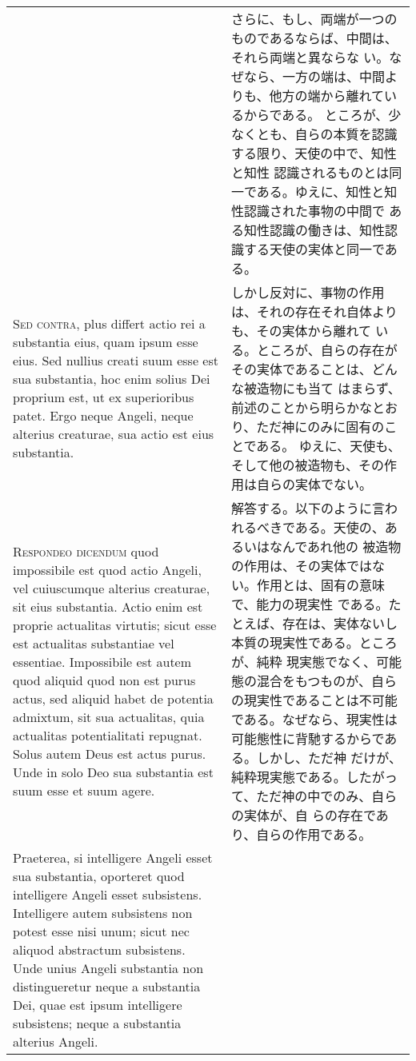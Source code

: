 \documentclass[10pt]{jsarticle} %
\begin{document}
\begin{longtable}{p{21em}p{21em}}
&
さらに、もし、両端が一つのものであるならば、中間は、それら両端と異ならな
 い。なぜなら、一方の端は、中間よりも、他方の端から離れているからである。
 ところが、少なくとも、自らの本質を認識する限り、天使の中で、知性と知性
 認識されるものとは同一である。ゆえに、知性と知性認識された事物の中間で
 ある知性認識の働きは、知性認識する天使の実体と同一である。


\\


{\scshape  Sed contra,} plus differt actio rei a substantia eius, quam
 ipsum esse eius. Sed nullius creati suum esse est sua substantia, hoc
 enim solius Dei proprium est, ut ex superioribus patet. Ergo neque
 Angeli, neque alterius creaturae, sua actio est eius substantia.

&

しかし反対に、事物の作用は、それの存在それ自体よりも、その実体から離れて
 いる。ところが、自らの存在がその実体であることは、どんな被造物にも当て
 はまらず、前述のことから明らかなとおり、ただ神にのみに固有のことである。
ゆえに、天使も、そして他の被造物も、その作用は自らの実体でない。
\\


{\scshape Respondeo dicendum} quod impossibile est quod actio Angeli,
 vel cuiuscumque alterius creaturae, sit eius substantia. Actio enim est
 proprie actualitas virtutis; sicut esse est actualitas substantiae vel
 essentiae. Impossibile est autem quod aliquid quod non est purus actus,
 sed aliquid habet de potentia admixtum, sit sua actualitas, quia
 actualitas potentialitati repugnat. Solus autem Deus est actus
 purus. Unde in solo Deo sua substantia est suum esse et suum
 agere. 

&

解答する。以下のように言われるべきである。天使の、あるいはなんであれ他の
 被造物の作用は、その実体ではない。作用とは、固有の意味で、能力の現実性
 である。たとえば、存在は、実体ないし本質の現実性である。ところが、純粋
 現実態でなく、可能態の混合をもつものが、自らの現実性であることは不可能
 である。なぜなら、現実性は可能態性に背馳するからである。しかし、ただ神
 だけが、純粋現実態である。したがって、ただ神の中でのみ、自らの実体が、自
 らの存在であり、自らの作用である。



\\

Praeterea, si intelligere Angeli esset sua substantia, oporteret
 quod intelligere Angeli esset subsistens. Intelligere autem subsistens
 non potest esse nisi unum; sicut nec aliquod abstractum
 subsistens. Unde unius Angeli substantia non distingueretur neque a
 substantia Dei, quae est ipsum intelligere subsistens; neque a
 substantia alterius Angeli. 


\end{longtable}
\end{document}
